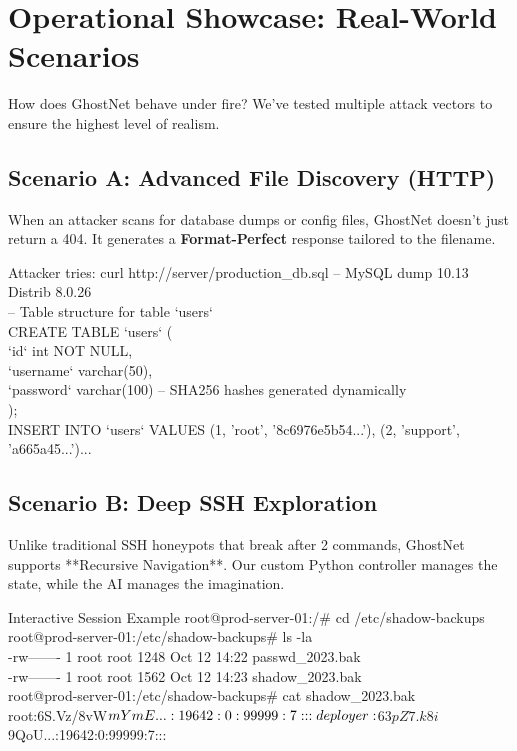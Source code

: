 \documentclass[11pt,a4paper,oneside]{article}
\begin{document}
\vspace{0.6cm}

\section{Operational Showcase: Real-World Scenarios}
How does GhostNet behave under fire? We've tested multiple attack vectors to ensure the highest level of realism.

\subsection{Scenario A: Advanced File Discovery (HTTP)}
When an attacker scans for database dumps or config files, GhostNet doesn't just return a 404. It generates a \textbf{Format-Perfect} response tailored to the filename.

\begin{terminalbox}{Attacker tries: curl http://server/production_db.sql}
-- MySQL dump 10.13  Distrib 8.0.26 \\
-- Table structure for table `users` \\
CREATE TABLE `users` ( \\
  `id` int NOT NULL, \\
  `username` varchar(50), \\
  `password` varchar(100)  -- SHA256 hashes generated dynamically \\
); \\
INSERT INTO `users` VALUES (1, 'root', '8c6976e5b54...'), (2, 'support', 'a665a45...')...
\end{terminalbox}

\subsection{Scenario B: Deep SSH Exploration}
Unlike traditional SSH honeypots that break after 2 commands, GhostNet supports **Recursive Navigation**. Our custom Python controller manages the state, while the AI manages the imagination.

\begin{terminalbox}{Interactive Session Example}
root@prod-server-01:/# cd /etc/shadow-backups \\
root@prod-server-01:/etc/shadow-backups# ls -la \\
-rw------- 1 root root  1248 Oct 12 14:22 passwd_2023.bak \\
-rw------- 1 root root  1562 Oct 12 14:23 shadow_2023.bak \\
root@prod-server-01:/etc/shadow-backups# cat shadow_2023.bak \\
root:$6$S.Vz/8vW$mYmE...:19642:0:99999:7::: \\
deployer:$6$3pZ7.k8i$9QoU...:19642:0:99999:7:::
\end{terminalbox}
\end{document}
